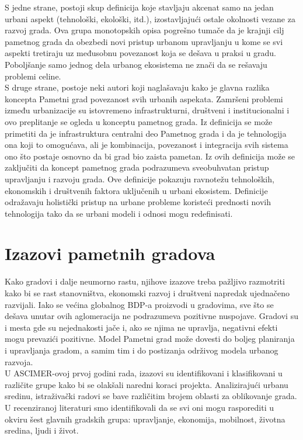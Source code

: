 \documentclass[a4paper,12pt]{article}
\begin{document}
{S jedne strane, postoji skup definicija koje stavljaju akcenat samo na jedan urbani aspekt (tehnološki, ekološki, itd.), izostavljajući ostale okolnosti vezane za razvoj grada. Ova grupa monotopskih opisa pogrešno tumače da je krajnji cilj pametnog grada da obezbedi novi pristup urbanom upravljanju u kome se svi aspekti tretiraju uz međusobnu povezanost koja se dešava u praksi u gradu. Poboljšanje samo jednog dela urbanog ekosistema ne znači da se rešavaju problemi celine. \\

S druge strane, postoje neki autori koji naglašavaju kako je glavna razlika koncepta Pametni grad povezanost svih urbanih aspekata. Zamršeni problemi između urbanizacije su istovremeno infrastrukturni, društveni i institucionalni i ovo preplitanje se ogleda u konceptu pametnog grada. Iz definicija se može primetiti da je infrastruktura centralni deo Pametnog grada i da je tehnologija ona koji to omogućava, ali je kombinacija, povezanost i integracija svih sistema ono što postaje osnovno da bi grad bio zaista pametan. Iz ovih definicija može se zaključiti da koncept pametnog grada podrazumeva sveobuhvatan pristup upravljanju i razvoju grada. Ove definicije pokazuju ravnotežu tehnoloških, ekonomskih i društvenih faktora uključenih u urbani ekosistem. Definicije odražavaju holistički pristup na urbane probleme koristeći prednosti novih tehnologija tako da se urbani modeli i odnosi mogu redefinisati.\\



\section{Izazovi pametnih gradova}	
\label{sec:termini_i_citiranje}

 Kako gradovi i dalje neumorno rastu, njihove izazove treba pažljivo razmotriti kako bi se rast stanovništva, ekonomski razvoj i društveni napredak ujednačeno razvijali. Iako se većina globalnog BDP-a proizvodi u gradovima, sve što se dešava unutar ovih aglomeracija ne podrazumeva pozitivne nuspojave. Gradovi su i mesta gde su nejednakosti jače i, ako se njima ne upravlja, negativni efekti mogu prevazići pozitivne. Model Pametni grad može dovesti do boljeg planiranja i upravljanja gradom, a samim tim i do postizanja održivog modela urbanog razvoja. \\

U ASCIMER-ovoj prvoj godini rada, izazovi su identifikovani i klasifikovani u različite grupe kako bi se olakšali naredni koraci projekta. Analizirajući urbanu sredinu, istraživački radovi se bave različitim brojem oblasti za oblikovanje grada. U recenziranoj literaturi smo identifikovali da se svi oni mogu rasporediti u okviru šest glavnih gradskih grupa: upravljanje, ekonomija, mobilnost, životna sredina, ljudi i život. \\

}
\end{document}
